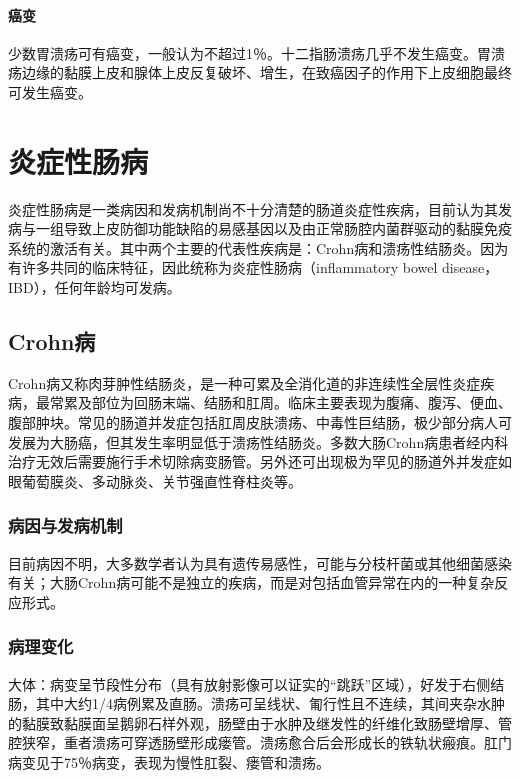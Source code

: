 \paragraph{癌变}
少数胃溃疡可有癌变，一般认为不超过1％。十二指肠溃疡几乎不发生癌变。胃溃疡边缘的黏膜上皮和腺体上皮反复破坏、增生，在致癌因子的作用下上皮细胞最终可发生癌变。

\section{炎症性肠病}

炎症性肠病是一类病因和发病机制尚不十分清楚的肠道炎症性疾病，目前认为其发病与一组导致上皮防御功能缺陷的易感基因以及由正常肠腔内菌群驱动的黏膜免疫系统的激活有关。其中两个主要的代表性疾病是：Crohn病和溃疡性结肠炎。因为有许多共同的临床特征，因此统称为炎症性肠病（inflammatory
bowel disease，IBD），任何年龄均可发病。

\subsection{Crohn病}

Crohn病又称肉芽肿性结肠炎，是一种可累及全消化道的非连续性全层性炎症疾病，最常累及部位为回肠末端、结肠和肛周。临床主要表现为腹痛、腹泻、便血、腹部肿块。常见的肠道并发症包括肛周皮肤溃疡、中毒性巨结肠，极少部分病人可发展为大肠癌，但其发生率明显低于溃疡性结肠炎。多数大肠Crohn病患者经内科治疗无效后需要施行手术切除病变肠管。另外还可出现极为罕见的肠道外并发症如眼葡萄膜炎、多动脉炎、关节强直性脊柱炎等。

\subsubsection{病因与发病机制}

目前病因不明，大多数学者认为具有遗传易感性，可能与分枝杆菌或其他细菌感染有关；大肠Crohn病可能不是独立的疾病，而是对包括血管异常在内的一种复杂反应形式。

\subsubsection{病理变化}

大体：病变呈节段性分布（具有放射影像可以证实的“跳跃”区域），好发于右侧结肠，其中大约1/4病例累及直肠。溃疡可呈线状、匍行性且不连续，其间夹杂水肿的黏膜致黏膜面呈鹅卵石样外观，肠壁由于水肿及继发性的纤维化致肠壁增厚、管腔狭窄，重者溃疡可穿透肠壁形成瘘管。溃疡愈合后会形成长的铁轨状瘢痕。肛门病变见于75％病变，表现为慢性肛裂、瘘管和溃疡。

